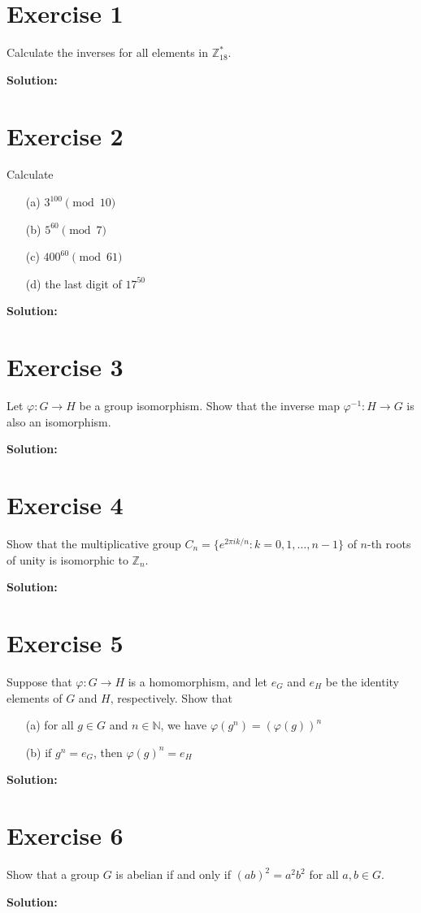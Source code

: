 \documentclass{article}
\begin{document}
\section*{Exercise 1}
Calculate the inverses for all elements in $\mathbb{Z}_{18}^*$.

\textbf{Solution:}
\newpage

\section*{Exercise 2}
Calculate
\begin{itemize}
\item[(a)] $3^{100} \pmod{10}$
\item[(b)] $5^{60} \pmod{7}$
\item[(c)] $400^{60} \pmod{61}$
\item[(d)] the last digit of $17^{50}$
\end{itemize}

\textbf{Solution:}
\newpage

\section*{Exercise 3}
Let $\varphi: G \to H$ be a group isomorphism. Show that the inverse map $\varphi^{-1}: H \to G$ is also an isomorphism.

\textbf{Solution:}
\newpage

\section*{Exercise 4}
Show that the multiplicative group $C_n = \{e^{2\pi i k/n} : k = 0,1,\ldots,n-1\}$ of $n$-th roots of unity is isomorphic to $\mathbb{Z}_n$.

\textbf{Solution:}
\newpage

\section*{Exercise 5}
Suppose that $\varphi: G \to H$ is a homomorphism, and let $e_G$ and $e_H$ be the identity elements of $G$ and $H$, respectively. Show that
\begin{itemize}
\item[(a)] for all $g \in G$ and $n \in \mathbb{N}$, we have $\varphi(g^n) = (\varphi(g))^n$
\item[(b)] if $g^n = e_G$, then $\varphi(g)^n = e_H$
\end{itemize}

\textbf{Solution:}
\newpage

\section*{Exercise 6}
Show that a group $G$ is abelian if and only if $(ab)^2 = a^2b^2$ for all $a,b \in G$.

\textbf{Solution:}
\end{document}
